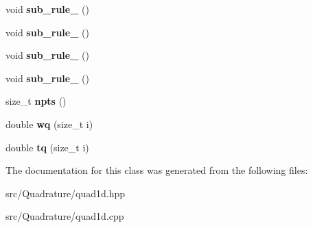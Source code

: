 \begin{DoxyCompactItemize}
\item 
\mbox{\label{classHCore2D_1_1LegendreGauss_a50b4238c7cade3272efe46641e1d2d3f}} 
void {\bfseries sub\+\_\+rule\+\_} ()
\item 
\mbox{\label{classHCore2D_1_1LegendreGauss_ae6a8077dd8cf9fc76ed1234b93691049}} 
void {\bfseries sub\+\_\+rule\+\_} ()
\item 
\mbox{\label{classHCore2D_1_1LegendreGauss_aad37934da18110fd078f1950a575fd3d}} 
void {\bfseries sub\+\_\+rule\+\_} ()
\item 
\mbox{\label{classHCore2D_1_1LegendreGauss_a6b7095506bd1d218c28f5778c6dea545}} 
void {\bfseries sub\+\_\+rule\+\_} ()
\item 
\mbox{\label{classHCore2D_1_1LegendreGauss_a1251635135ab00a28e128a058288e440}} 
size\+\_\+t {\bfseries npts} ()
\item 
\mbox{\label{classHCore2D_1_1LegendreGauss_a2800eb7a7c2648b1edb77231ef42608a}} 
double {\bfseries wq} (size\+\_\+t i)
\item 
\mbox{\label{classHCore2D_1_1LegendreGauss_aa10e032f4ea04323773b23177b4124ee}} 
double {\bfseries tq} (size\+\_\+t i)
\end{DoxyCompactItemize}


The documentation for this class was generated from the following files\+:\begin{DoxyCompactItemize}
\item 
src/\+Quadrature/quad1d.\+hpp\item 
src/\+Quadrature/quad1d.\+cpp\end{DoxyCompactItemize}
